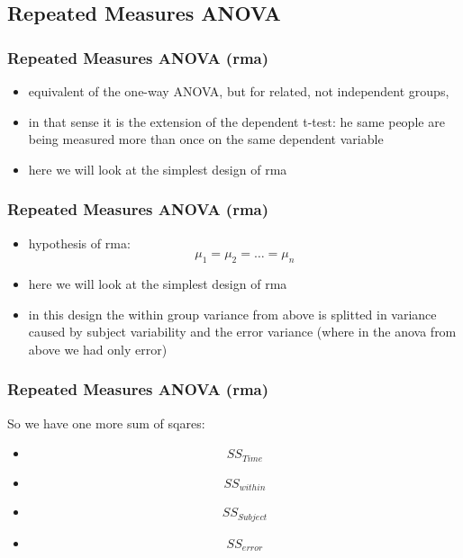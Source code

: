 
\subsection{Repeated Measures ANOVA}
\begin{frame}\frametitle{Repeated Measures ANOVA (rma)}
  \begin{itemize}
  \item equivalent of the one-way ANOVA, but for related, not independent groups,  \item in that sense it is the extension of the dependent t-test: he same people are being measured more than once on the same dependent variable
  \item here we will look at the simplest design of rma
  \end{itemize}
\end{frame}


\begin{frame}\frametitle{Repeated Measures ANOVA (rma)}
  \begin{itemize}
  \item hypothesis of rma: $$\mu_1=\mu_2=\ldots =\mu_n$$
  \item here we will look at the simplest design of rma
  \item in this design the within group variance from above is splitted in variance caused by subject variability and the error variance (where in the anova from above we had only error) 
  \end{itemize}
\end{frame}


\begin{frame}\frametitle{Repeated Measures ANOVA (rma)}
So we have one more sum of sqares:
  \begin{itemize}
  \item $$SS_{Time}$$
  \item $$SS_{within} $$
  \item $$SS_{Subject}$$
  \item $$SS_{error}$$
  \end{itemize}
\end{frame}


